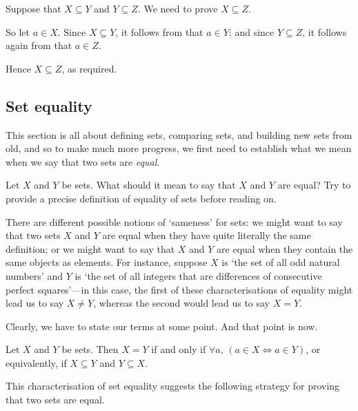 \begin{cproof}
Suppose that $X \subseteq Y$ and $Y \subseteq Z$. We need to prove $X \subseteq Z$.

So let $a \in X$. Since $X \subseteq Y$, it follows from  that $a \in Y$; and since $Y \subseteq Z$, it follows again from  that $a \in Z$.

Hence $X \subseteq Z$, as required.
\end{cproof}

\subsection*{Set equality}

This section is all about defining sets, comparing sets, and building new sets from old, and so to make much more progress, we first need to establish what we mean when we say that two sets are \textit{equal}.

\begin{discussion}
\label{dscSetEquality}
Let $X$ and $Y$ be sets. What should it mean to say that $X$ and $Y$ are equal? Try to provide a precise definition of equality of sets before reading on.
\end{discussion}

There are different possible notions of `sameness' for sets: we might want to say that two sets $X$ and $Y$ are equal when they have quite literally the same definition; or we might want to say that $X$ and $Y$ are equal when they contain the same objects as elements. For instance, suppose $X$ is `the set of all odd natural numbers' and $Y$ is `the set of all integers that are differences of consecutive perfect squares'---in this case, the first of these characterisations of equality might lead us to say $X \ne Y$, whereas the second would lead us to say $X = Y$.

Clearly, we have to state our terms at some point. And that point is now.

\begin{axiom}
\label{axSetEquality}
Let $X$ and $Y$ be sets. Then $X=Y$ if and only if $\forall a,\, (a \in X \Leftrightarrow a \in Y)$, or equivalently, if $X \subseteq Y$ and $Y \subseteq X$.
\end{axiom}

This characterisation of set equality suggests the following strategy for proving that two sets are equal.

